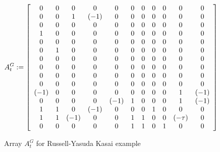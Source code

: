 \begin{figure}[ht]
\caption{Array $A^G_t$ for Russell-Yasuda Kasai example}
\label{RY:AGfig}
\[
A^G_t \assign\left[
\begin{array}{ccccccccccc}
0	&0	&0	&0	&0	&0	&0	&0	&0	&0	&0\\
0	&0	&1	&(-1)	&0	&0	&0	&0	&0	&0	&0\\
0	&0	&0	&0	&0	&0	&0	&0	&0	&0	&0\\
1	&0	&0	&0	&0	&0	&0	&0	&0	&0	&0\\
0	&0	&0	&0	&0	&0	&0	&0	&0	&0	&0\\
0	&1	&0	&0	&0	&0	&0	&0	&0	&0	&0\\%
0	&0	&0	&0	&0	&0	&0	&0	&0	&0	&0\\
0	&0	&0	&0	&0	&0	&0	&0	&0	&0	&0\\%
0	&0	&0	&0	&0	&0	&0	&0	&0	&0	&0\\
0	&0	&0	&0	&0	&0	&0	&0	&0	&0	&0\\%
(-1)	&0	&0	&0	&0	&0	&0	&0	&0	&1	&(-1)\\%
0	&0	&0	&0	&(-1)	&1	&0	&0	&0	&1	&(-1)\\
1	&1	&0	&(-1)	&0	&0	&0	&1	&0	&0	&0\\
1	&1	&(-1)	&0	&0	&1	&1	&0	&0	&(-\tau)	&0\\
0	&0	&0	&0	&0	&1	&1	&0	&1	&0	&0
\end{array}
\right]
\]
\end{figure}

